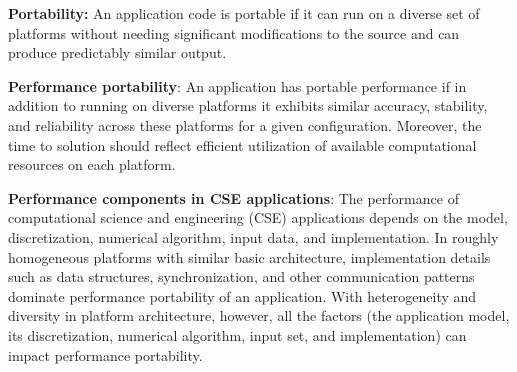 \documentclass[]{article}
\date{}
\begin{document}
\pagestyle{fancy}
\renewcommand{\headrulewidth}{0pt}
  
\thispagestyle{empty}
\textbf{\newline}
\textbf{\newline}
\textbf{\newline}


\textbf{Portability:} An application code is portable if it can run on a
diverse set of platforms without needing significant modifications to
the source and can produce predictably similar output.

\textbf{Performance portability}: An application has portable
performance if in addition to running on diverse platforms it exhibits
similar accuracy, stability, and reliability across these platforms for
a given configuration. Moreover, the time to solution should reflect
efficient utilization of available computational resources on each
platform.

\textbf{Performance components in CSE applications}: The performance
of computational science and engineering (CSE) applications depends on
the model, discretization, numerical algorithm, input data, and
implementation. In roughly homogeneous platforms with similar basic
architecture, implementation details such as data structures,
synchronization, and other communication patterns dominate performance
portability of an application. With heterogeneity and diversity in
platform architecture, however, all the factors (the application model,
its discretization, numerical algorithm, input set, and implementation)
can impact performance portability.
\end{document}
